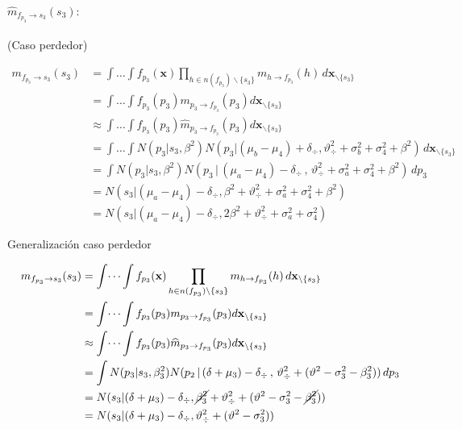 \documentclass[11pt,twoside,spanish]{report} %
\begin{document}
\paragraph{$\widehat{m}_{f_{p_3} \rightarrow s_3}(s_3):$}(Caso perdedor)

\begin{equation}
	\begin{split}
		m_{f_{p_3} \rightarrow s_3}(s_3) & = \int \dots \int f_{p_3}(\textbf{x}) \prod_{h \in n(f_{p_3}) \backslash \{s_3\} } m_{h \rightarrow f_{p_3}}(h) \, d\textbf{x}_{\backslash \{s_3\} }  \\
		&= \int \dots \int f_{p_3}(p_3)m_{p_3 \rightarrow f_{p_3}}(p_3) d\textbf{x}_{\backslash \{s_3\} }  \\
		&\approx \int \dots \int f_{p_3}(p_3)\widehat{m}_{p_3 \rightarrow f_{p_3}}(p_3) d\textbf{x}_{\backslash \{s_3\} }  \\
		&= \int \dots \int N(p_3| s_3, \beta^2)  N( p_3 |  (\mu_b - \mu_4) + \delta_{\div},\vartheta_{\div}^2 + \sigma_b^2 + \sigma_4^2 + \beta^2) \, d\textbf{x}_{\backslash \{s_3\} }\\
		& = \int N(p_3| s_3, \beta^2) N( p_3 \,|\,  (\mu_a - \mu_4) - \delta_{\div}  \,,\,\vartheta_{\div}^2 + \sigma_a^2 + \sigma_4^2 + \beta^2) \, dp_3 \\
		& = N(s_3|(\mu_a - \mu_4) - \delta_{\div}, \beta^2+\vartheta_{\div}^2 + \sigma_a^2 + \sigma_4^2+ \beta^2) \\
		& = N(s_3|(\mu_a - \mu_4) - \delta_{\div}, 2\beta^2+\vartheta_{\div}^2 + \sigma_a^2 + \sigma_4^2 )
	\end{split}
\end{equation}

Generalizaci\'on caso perdedor

\begin{equation}
	\begin{split}
		m_{f_{p_3} \rightarrow s_3}(s_3) & = \int \dots \int f_{p_3}(\textbf{x}) \prod_{h \in n(f_{p_3}) \backslash \{s_3\} } m_{h \rightarrow f_{p_3}}(h) \, d\textbf{x}_{\backslash \{s_3\} }  \\
		&= \int \dots \int f_{p_3}(p_3)m_{p_3 \rightarrow f_{p_3}}(p_3) d\textbf{x}_{\backslash \{s_3\} }  \\
		&\approx \int \dots \int f_{p_3}(p_3)\widehat{m}_{p_3 \rightarrow f_{p_3}}(p_3) d\textbf{x}_{\backslash \{s_3\} }  \\
		&= \int  N(p_3| s_3, \beta_3^2)   N( p_2 \,|\, (\delta + \mu_3) - \delta_{\div}  \,,\,\vartheta_{\div}^2 + (\vartheta^2 - \sigma_3^2 - \beta_3^2)) \, dp_3\\
		&=  N( s_3|   (\delta + \mu_3) - \delta_{\div} , \cancel{\beta_3^2}+\vartheta_{\div}^2 + (\vartheta^2 - \sigma_3^2 - \cancel{\beta_3^2})) \\
		&=  N( s_3|   (\delta + \mu_3) - \delta_{\div} , \vartheta_{\div}^2 + (\vartheta^2 - \sigma_3^2 ))
	\end{split}
\end{equation}
\end{document}
